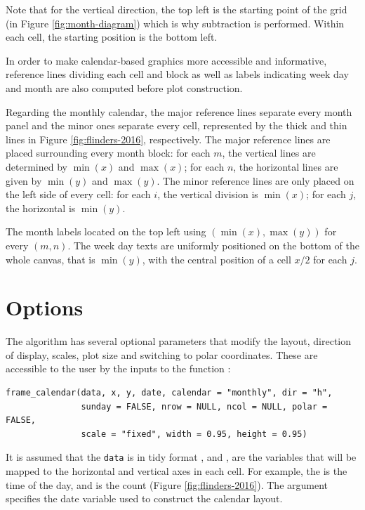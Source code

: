 \documentclass[article]{jss}
\theoremstyle{definition}
\theoremstyle{definition}
\theoremstyle{definition}
\theoremstyle{remark}
\begin{document}
Note that for the vertical direction, the top left is the starting point
of the grid (in Figure \ref{fig:month-diagram}) which is why subtraction
is performed. Within each cell, the starting position is the bottom
left.

In order to make calendar-based graphics more accessible and
informative, reference lines dividing each cell and block as well as
labels indicating week day and month are also computed before plot
construction.

Regarding the monthly calendar, the major reference lines separate every
month panel and the minor ones separate every cell, represented by the
thick and thin lines in Figure \ref{fig:flinders-2016}, respectively.
The major reference lines are placed surrounding every month block: for
each \(m\), the vertical lines are determined by \(\min{(x)}\) and
\(\max{(x)}\); for each \(n\), the horizontal lines are given by
\(\min{(y)}\) and \(\max{(y)}\). The minor reference lines are only
placed on the left side of every cell: for each \(i\), the vertical
division is \(\min{(x)}\); for each \(j\), the horizontal is
\(\min{(y)}\).

The month labels located on the top left using
\((\min{(x)}, \max{(y)})\) for every \((m, n)\). The week day texts are
uniformly positioned on the bottom of the whole canvas, that is
\(\min{(y)}\), with the central position of a cell \(x / 2\) for each
\(j\).

\section{Options}\label{options}

\label{sec:opt}

The algorithm has several optional parameters that modify the layout,
direction of display, scales, plot size and switching to polar
coordinates. These are accessible to the user by the inputs to the
function :

\begin{verbatim}
frame_calendar(data, x, y, date, calendar = "monthly", dir = "h", 
               sunday = FALSE, nrow = NULL, ncol = NULL, polar = FALSE, 
               scale = "fixed", width = 0.95, height = 0.95)
\end{verbatim}

It is assumed that the \texttt{data} is in tidy format
\citep{wickham2014tidy}, and ,  are the variables that
will be mapped to the horizontal and vertical axes in each cell. For
example, the  is the time of the day, and  is the count
(Figure \ref{fig:flinders-2016}). The  argument specifies the
date variable used to construct the calendar layout.
\end{document}
